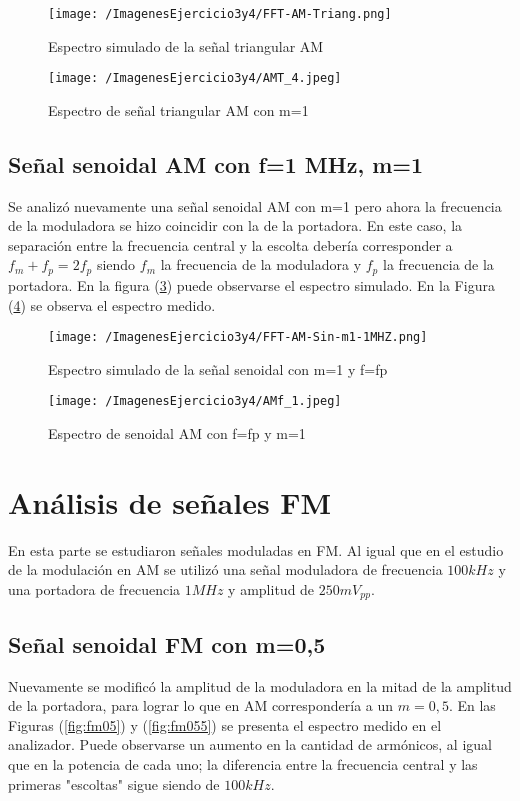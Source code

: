 \begin{figure}[H]
	\centering
	\texttt{[image: /ImagenesEjercicio3y4/FFT-AM-Triang.png]}
\caption{Espectro simulado de la señal triangular AM}
	\label{fig:simtri}
\end{figure}


\begin{figure}[H]
	\centering
	\texttt{[image: /ImagenesEjercicio3y4/AMT\_4.jpeg]}
\caption{Espectro de señal triangular AM con m=1}
	\label{fig:trign}
\end{figure}

\subsection{Señal senoidal AM con f=1 MHz, m=1 }

Se analizó nuevamente una señal senoidal AM con m=1 pero ahora la frecuencia de la moduladora se hizo coincidir con la de la portadora. En este caso, la separación entre la frecuencia central y la escolta debería corresponder a $f_m+f_p=2f_p$ siendo $f_m$ la frecuencia de la moduladora y $f_p$ la frecuencia de la portadora. En la figura (\ref{fig:simsin1}) puede observarse el espectro simulado. En la Figura (\ref{fig:amff}) se observa el espectro medido.

\begin{figure}[H]
	\centering
	\texttt{[image: /ImagenesEjercicio3y4/FFT-AM-Sin-m1-1MHZ.png]}
\caption{Espectro simulado de la señal senoidal con m=1 y f=fp}
	\label{fig:simsin1}
\end{figure}

\begin{figure}[H]
	\centering
	\texttt{[image: /ImagenesEjercicio3y4/AMf\_1.jpeg]}
\caption{Espectro de senoidal AM con f=fp y m=1}
	\label{fig:amff}
\end{figure}

\section{Análisis de señales FM}

En esta parte se estudiaron señales moduladas en FM. Al igual que en el estudio de la modulación en AM se utilizó una señal moduladora de frecuencia $100 kHz$ y una portadora de frecuencia $1 MHz$ y amplitud de $250 mV_{pp}$.

\subsection{Señal senoidal FM con m=0,5}
Nuevamente se modificó la amplitud de la moduladora en la mitad de la amplitud de la portadora, para lograr lo que en AM correspondería a un $m=0,5$. En las Figuras (\ref{fig:fm05}) y (\ref{fig:fm055}) se presenta el espectro medido en el analizador. Puede observarse un aumento en la cantidad de armónicos, al igual que en la potencia de cada uno; la diferencia entre la frecuencia central y las primeras "escoltas" sigue siendo de $100 kHz$.

